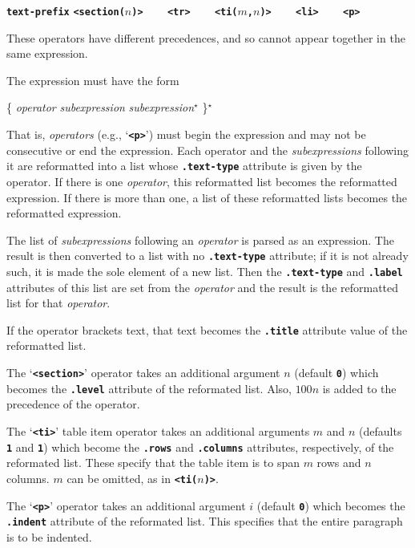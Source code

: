 \documentclass[12pt]{article}
\newcommand{\TT}[1]{{\tt \bfseries #1}}
\newcommand{\ttkey}[1]{{\tt \bfseries #1}}
\newcommand{\tttkey}[1]{{\tt \bfseries <#1>}}
\newcommand{\STAR}{{\Large $^\star$}}
\newenvironment{indpar}[1][0.3in]%
	{\begin{list}{}%
		     {\setlength{\itemsep}{0in}%
		      \setlength{\topsep}{0in}%
		      \setlength{\parsep}{1ex}%
		      \setlength{\labelwidth}{#1}%
		      \setlength{\leftmargin}{#1}%
		      \addtolength{\leftmargin}{\labelsep}}%
	 \item}%
	{\end{list}}
\begin{document}
\begin{indpar}[1em]

\newcommand{\OP}[1]{\tttkey{#1}}

\bigskip

\ttkey{text-prefix} \hfill \OP{section($n$)}
~~~ \OP{tr} ~~~ \OP{ti($m$,$n$)}
~~~ \OP{li} ~~~ \OP{p}

\begin{indpar}[0.5em]
These operators have different
precedences, and so cannot appear together in the same expression.

The expression must have the form
\begin{center}
\{ {\em operator} {\em subexpression} {\em subexpression}\STAR{} \}\STAR{}
\end{center}

That is, {\em operators}
(e.g., `\TT{<p>}') must begin the expression and may
not be consecutive or end the expression.  Each operator and the
{\em subexpressions} following it are reformatted into a list whose
\TT{.text-type} attribute is given by the operator.  If there is one
{\em operator}, this reformatted list becomes the reformatted expression.
If there is more than one, a list of these reformatted lists
becomes the reformatted expression.

The list of {\em subexpressions} following an {\em operator} is parsed as
an expression.  The result is then converted to a list with no
\TT{.text-type} attribute; if it is not already such, it is made
the sole element of a new list.  Then the \TT{.text-type} and \TT{.label}
attributes of this list are set from the {\em operator} and the result
is the reformatted list for that {\em operator}.

If the operator brackets text, that text becomes the \TT{.title} attribute
value of the reformatted list.

The `\TT{<section>}'
operator takes an additional argument $n$ (default \TT{0})
which becomes the \TT{.level} attribute of the reformated list.  Also,
$100n$ is added to the precedence of the operator.

The `\TT{<ti>}' table item
operator takes an additional arguments $m$ and $n$ (defaults \TT{1} and
\TT{1})
which become the \TT{.rows} and \TT{.columns} attributes, respectively,
of the reformated list.  These specify that the table item is to span
$m$ rows and $n$ columns.  $m$ can be omitted, as in \TT{<ti(}$n$\TT{)>}.

The `\TT{<p>}'
operator takes an additional argument $i$ (default \TT{0})
which becomes the \TT{.indent} attribute of the reformated list.  This
specifies that the entire paragraph is to be indented.


\end{indpar}
\end{indpar}
\end{document}
